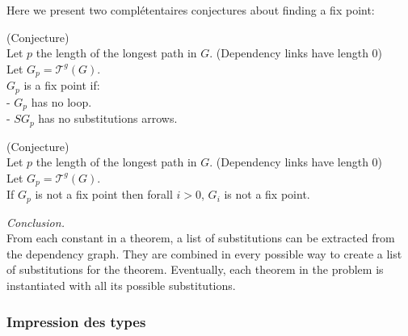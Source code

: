 \noindent Here we present two complétentaires conjectures about finding a fix point: 
\begin{thm}(Conjecture)
\\Let $p$ the length of the longest path in $G$. (Dependency links have length 0) 
\\Let $G_p = \mathcal{T}^g(G)$.
\\$G_p$ is a fix point if:
\\- $G_p$ has no loop.
\\- $SG_p$ has no substitutions arrows.
\end{thm} 
\begin{thm}(Conjecture)
\\Let $p$ the length of the longest path in $G$. (Dependency links have length 0) 
\\Let $G_p = \mathcal{T}^g(G)$.
\\If $G_p$ is not a fix point then forall $i>0$, $G_i$ is not a fix point.
\end{thm} 


\noindent \textit{Conclusion.}
\\From each constant in a theorem, a list of substitutions can be extracted from the dependency graph. They are combined in every possible way to create a list of substitutions for the theorem. Eventually, each theorem in the problem is instantiated with all its possible substitutions.


\subsubsection{Impression des types}

